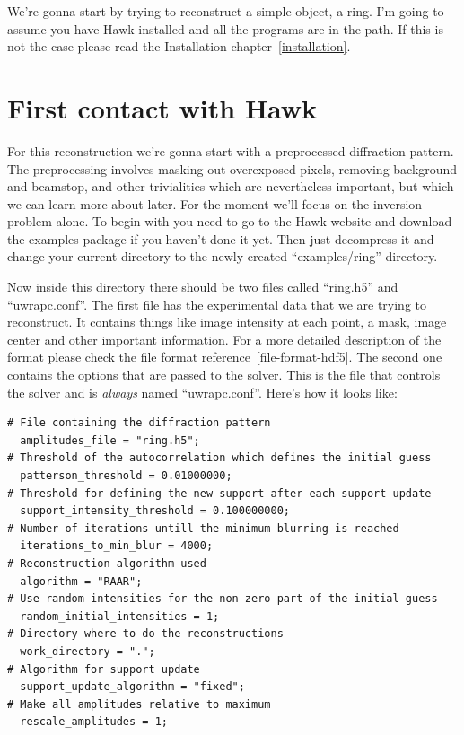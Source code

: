 \documentclass{report}
\begin{document}
We're gonna start by trying to reconstruct a simple object, a ring. I'm going
 to assume you have Hawk installed and all the programs are in the path. If
 this is not the case please read the Installation chapter~\ref{installation}.

\section{First contact with Hawk}
\label{tutorial-ring}

For this reconstruction we're gonna start with a preprocessed diffraction pattern.
 The preprocessing involves masking out overexposed pixels, removing background and 
beamstop, and other trivialities which are nevertheless important, but which we can
 learn more about later. For the moment we'll focus on the inversion problem alone. 
To begin with you need to go to the Hawk website and download the examples package if
 you haven't done it yet. Then just decompress it and change your current directory
 to the newly created ``examples/ring'' directory.

\vspace {0.1 in}




Now inside this directory there should be two files called ``ring.h5'' and ``uwrapc.conf''.
The first file has the experimental data that we are trying to reconstruct.
It contains things like image intensity at each point, a mask, image center
and other important information. For a more detailed description of the format
please check the file format reference~\ref{file-format-hdf5}. 
The second one
contains the options that are passed to the solver. This is the file that controls
the solver and is {\em always} named ``uwrapc.conf''. Here's how it looks like:

\begin{verbatim}
# File containing the diffraction pattern
  amplitudes_file = "ring.h5";
# Threshold of the autocorrelation which defines the initial guess
  patterson_threshold = 0.01000000;
# Threshold for defining the new support after each support update
  support_intensity_threshold = 0.100000000;
# Number of iterations untill the minimum blurring is reached
  iterations_to_min_blur = 4000;
# Reconstruction algorithm used
  algorithm = "RAAR";
# Use random intensities for the non zero part of the initial guess
  random_initial_intensities = 1;
# Directory where to do the reconstructions
  work_directory = ".";
# Algorithm for support update
  support_update_algorithm = "fixed";
# Make all amplitudes relative to maximum 
  rescale_amplitudes = 1;
\end{verbatim}
\end{document}

